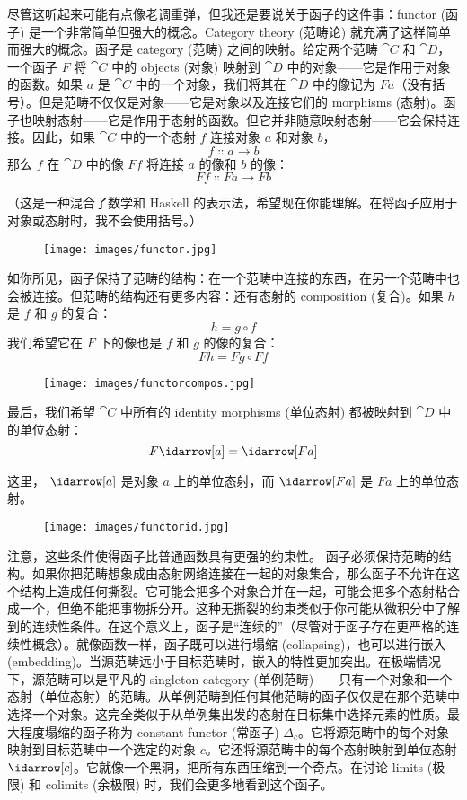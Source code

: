 
\lettrine[lhang=0.17]{尽}{管这听起来可能有点像老调重弹}，但我还是要说关于函子的这件事：functor (函子) 是一个非常简单但强大的概念。Category theory (范畴论) 就充满了这样简单而强大的概念。函子是 category (范畴) 之间的映射。给定两个范畴 $\cat{C}$ 和 $\cat{D}$，一个函子 $F$ 将 $\cat{C}$ 中的 objects (对象) 映射到 $\cat{D}$ 中的对象——它是作用于对象的函数。如果 $a$ 是 $\cat{C}$ 中的一个对象，我们将其在 $\cat{D}$ 中的像记为 $F a$（没有括号）。但是范畴不仅仅是对象——它是对象以及连接它们的 morphisms (态射)。函子也映射态射——它是作用于态射的函数。但它并非随意映射态射——它会保持连接。因此，如果 $\cat{C}$ 中的一个态射 $f$ 连接对象 $a$ 和对象 $b$，
\[f \Colon a \to b\]
那么 $f$ 在 $\cat{D}$ 中的像 $F f$ 将连接 $a$ 的像和 $b$ 的像：
\[F f \Colon F a \to F b\]

（这是一种混合了数学和 Haskell 的表示法，希望现在你能理解。在将函子应用于对象或态射时，我不会使用括号。）

\begin{figure}[H]
  \centering\texttt{[image: images/functor.jpg]}
\end{figure}

\noindent
如你所见，函子保持了范畴的结构：在一个范畴中连接的东西，在另一个范畴中也会被连接。但范畴的结构还有更多内容：还有态射的 composition (复合)。如果 $h$ 是 $f$ 和 $g$ 的复合：
\[h = g \circ f\]
我们希望它在 $F$ 下的像也是 $f$ 和 $g$ 的像的复合：
\[F h = F g \circ F f\]

\begin{figure}[H]
  \centering
  \texttt{[image: images/functorcompos.jpg]}
\end{figure}

\noindent
最后，我们希望 $\cat{C}$ 中所有的 identity morphisms (单位态射) 都被映射到 $\cat{D}$ 中的单位态射：
\[F \idarrow[a] = \idarrow[F a]\]

\noindent
这里， $\idarrow[a]$ 是对象 $a$ 上的单位态射，而 $\idarrow[F a]$ 是 $F a$ 上的单位态射。

\begin{figure}[H]
  \centering
  \texttt{[image: images/functorid.jpg]}
\end{figure}

\noindent
注意，这些条件使得函子比普通函数具有更强的约束性。
函子必须保持范畴的结构。如果你把范畴想象成由态射网络连接在一起的对象集合，那么函子不允许在这个结构上造成任何撕裂。它可能会把多个对象合并在一起，可能会把多个态射粘合成一个，但绝不能把事物拆分开。这种无撕裂的约束类似于你可能从微积分中了解到的连续性条件。在这个意义上，函子是“连续的”（尽管对于函子存在更严格的连续性概念）。就像函数一样，函子既可以进行塌缩 (collapsing)，也可以进行嵌入 (embedding)。当源范畴远小于目标范畴时，嵌入的特性更加突出。在极端情况下，源范畴可以是平凡的 singleton category (单例范畴)——只有一个对象和一个态射（单位态射）的范畴。从单例范畴到任何其他范畴的函子仅仅是在那个范畴中选择一个对象。这完全类似于从单例集出发的态射在目标集中选择元素的性质。最大程度塌缩的函子称为 constant functor (常函子) $\Delta_c$。它将源范畴中的每个对象映射到目标范畴中一个选定的对象 $c$。它还将源范畴中的每个态射映射到单位态射 $\idarrow[c]$。它就像一个黑洞，把所有东西压缩到一个奇点。在讨论 limits (极限) 和 colimits (余极限) 时，我们会更多地看到这个函子。

